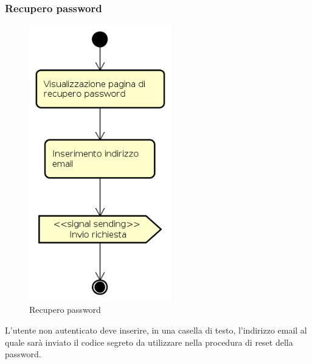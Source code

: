 \subsubsection{Recupero password}
\begin{figure}[H]
\begin{center}
\includegraphics[height=12cm]{res/sections/backend/activities/recuperoPassword.png}
\caption{Recupero password}
\end{center}
\end{figure}
L'utente non autenticato deve inserire, in una casella di testo, l'indirizzo email al quale sarà inviato il codice segreto da utilizzare nella procedura di reset della password.
